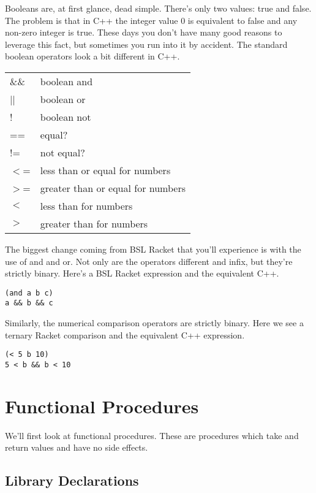 \documentclass[]{tufte-handout}
\begin{document}
Booleans are, at first glance, dead simple. There's only two values: true and false.  The problem is that in C++ the integer value 0 is equivalent to false and any non-zero integer is true.  These days you don't have many good reasons to leverage this fact, but sometimes you run into it by accident. The standard boolean operators look a bit different in C++.

\begin{center}
\begin{tabular}{ll}
\&\& & boolean and \\
|| & boolean or \\
! & boolean not \\
== & equal? \\
!= & not equal? \\
$<$= & less than or equal for numbers \\
$>$= & greater than or equal for numbers \\
$<$ & less than for numbers \\
$>$ & greater than for numbers
\end{tabular}
\end{center}

The biggest change coming from BSL Racket that you'll experience is with the use of and and or.  Not only are the operators different and infix, but they're strictly binary.  Here's a BSL Racket expression and the equivalent C++.
\begin{verbatim}
(and a b c) 
a && b && c 
\end{verbatim}
Similarly, the numerical comparison operators are strictly binary. Here we see a ternary Racket comparison and the equivalent C++ expression.
\begin{verbatim}
(< 5 b 10)
5 < b && b < 10
\end{verbatim}


\section{Functional Procedures}

We'll first look at functional procedures. These are procedures which take and return values and have no side effects.  

\subsection{Library Declarations}
\end{document}
